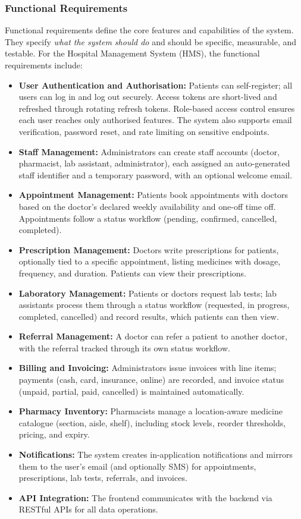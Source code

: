 \documentclass[12pt,a4paper]{report}
\begin{document}
\subsubsection*{Functional Requirements}
Functional requirements define the core features and capabilities of the system. They
specify \emph{what the system should do} and should be specific, measurable, and
testable. For the Hospital Management System (HMS), the functional requirements include:
\begin{itemize}[leftmargin=1.4em]
  \item \textbf{User Authentication and Authorisation:} Patients can self-register;
        all users can log in and log out securely. Access tokens are short-lived and
        refreshed through rotating refresh tokens. Role-based access control ensures
        each user reaches only authorised features. The system also supports email
        verification, password reset, and rate limiting on sensitive endpoints.
  \item \textbf{Staff Management:} Administrators can create staff accounts (doctor,
        pharmacist, lab assistant, administrator), each assigned an auto-generated
        staff identifier and a temporary password, with an optional welcome email.
  \item \textbf{Appointment Management:} Patients book appointments with doctors based
        on the doctor's declared weekly availability and one-off time off. Appointments
        follow a status workflow (pending, confirmed, cancelled, completed).
  \item \textbf{Prescription Management:} Doctors write prescriptions for patients,
        optionally tied to a specific appointment, listing medicines with dosage,
        frequency, and duration. Patients can view their prescriptions.
  \item \textbf{Laboratory Management:} Patients or doctors request lab tests; lab
        assistants process them through a status workflow (requested, in progress,
        completed, cancelled) and record results, which patients can then view.
  \item \textbf{Referral Management:} A doctor can refer a patient to another doctor,
        with the referral tracked through its own status workflow.
  \item \textbf{Billing and Invoicing:} Administrators issue invoices with line items;
        payments (cash, card, insurance, online) are recorded, and invoice status
        (unpaid, partial, paid, cancelled) is maintained automatically.
  \item \textbf{Pharmacy Inventory:} Pharmacists manage a location-aware medicine
        catalogue (section, aisle, shelf), including stock levels, reorder thresholds,
        pricing, and expiry.
  \item \textbf{Notifications:} The system creates in-application notifications and
        mirrors them to the user's email (and optionally SMS) for appointments,
        prescriptions, lab tests, referrals, and invoices.
  \item \textbf{API Integration:} The frontend communicates with the backend via
        RESTful APIs for all data operations.
\end{itemize}
\end{document}
